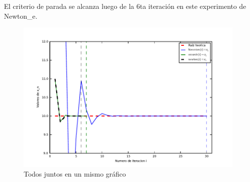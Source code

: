 El criterio de parada se alcanza luego de la 6ta iteración en este experimento de Newton\_e.

\begin{figure}[!h]
	\begin{center}
		  \includegraphics[keepaspectratio]{../Imagenes/exp2/todos_juntos.pdf}
		  \caption{Todos juntos en un mismo gráfico}
		  \label{fig:contra1}
	\end{center}
\end{figure}
\FloatBarrier